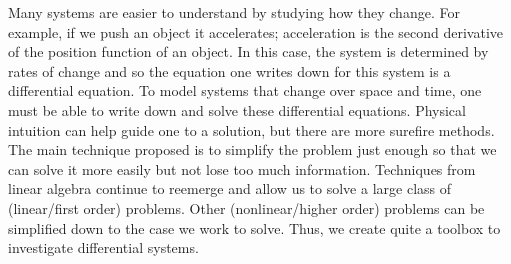 Many systems are easier to understand by studying how they change.  For example, if we push an object it accelerates; acceleration is the second derivative of the position function of an object.  In this case, the system is determined by rates of change and so the equation one writes down for this system is a differential equation.  To model systems that change over space and time, one must be able to write down and solve these differential equations.  Physical intuition can help guide one to a solution, but there are more surefire methods.  The main technique proposed is to simplify the problem just enough so that we can solve it more easily but not lose too much information.  Techniques from linear algebra continue to reemerge and allow us to solve a large class of (linear/first order) problems.  Other (nonlinear/higher order) problems can be simplified down to the case we work to solve.  Thus, we create quite a toolbox to investigate differential systems.

